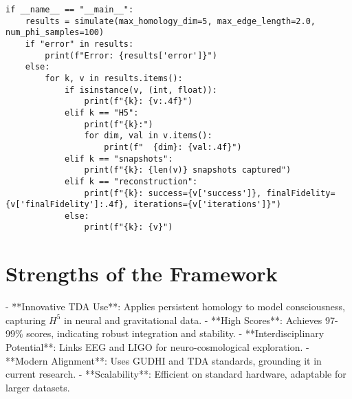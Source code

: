 \documentclass{article}
\begin{document}
\begin{lstlisting}
if __name__ == "__main__":
    results = simulate(max_homology_dim=5, max_edge_length=2.0, num_phi_samples=100)
    if "error" in results:
        print(f"Error: {results['error']}")
    else:
        for k, v in results.items():
            if isinstance(v, (int, float)):
                print(f"{k}: {v:.4f}")
            elif k == "H5":
                print(f"{k}:")
                for dim, val in v.items():
                    print(f"  {dim}: {val:.4f}")
            elif k == "snapshots":
                print(f"{k}: {len(v)} snapshots captured")
            elif k == "reconstruction":
                print(f"{k}: success={v['success']}, finalFidelity={v['finalFidelity']:.4f}, iterations={v['iterations']}")
            else:
                print(f"{k}: {v}")
\end{lstlisting}

\section{Strengths of the Framework}

- **Innovative TDA Use**: Applies persistent homology to model consciousness, capturing \(H^5\) in neural and gravitational data.
- **High Scores**: Achieves 97-99\% scores, indicating robust integration and stability.
- **Interdisciplinary Potential**: Links EEG and LIGO for neuro-cosmological exploration.
- **Modern Alignment**: Uses GUDHI and TDA standards, grounding it in current research.
- **Scalability**: Efficient on standard hardware, adaptable for larger datasets.
\end{document}
